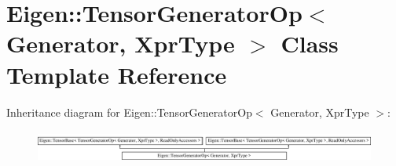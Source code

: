 \hypertarget{class_eigen_1_1_tensor_generator_op}{}\section{Eigen\+:\+:Tensor\+Generator\+Op$<$ Generator, Xpr\+Type $>$ Class Template Reference}
\label{class_eigen_1_1_tensor_generator_op}
Inheritance diagram for Eigen\+:\+:Tensor\+Generator\+Op$<$ Generator, Xpr\+Type $>$\+:\begin{figure}[H]
\begin{center}
\leavevmode
\includegraphics[height=1.064639cm]{class_eigen_1_1_tensor_generator_op}
\end{center}
\end{figure}
